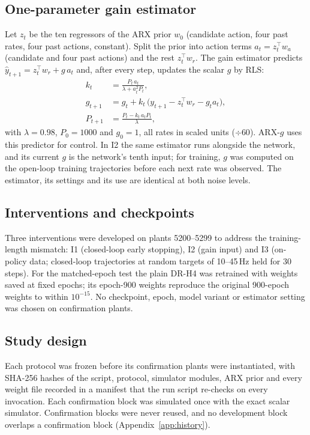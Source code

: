 \documentclass[11pt]{article}
\newcommand{\Hz}{\,Hz}
\begin{document}
\subsection{One-parameter gain estimator}\label{sec:gain}
Let $z_t$ be the ten regressors of the ARX prior $w_0$ (candidate action, four past rates, four past actions, constant). Split the prior into action terms $a_t=z_t^\top w_a$ (candidate and four past actions) and the rest $z_t^\top w_r$. The gain estimator predicts $\hat y_{t+1}=z_t^\top w_r + g\,a_t$ and, after every step, updates the scalar $g$ by RLS:
\begin{align}
k_t &= \frac{P_t\,a_t}{\lambda + a_t^2 P_t},\nonumber\\
g_{t+1} &= g_t + k_t\,\big(y_{t+1} - z_t^\top w_r - g_t a_t\big),\\
P_{t+1} &= \frac{P_t - k_t\,a_t P_t}{\lambda},\nonumber
\end{align}
with $\lambda=0.98$, $P_0=1000$ and $g_0=1$, all rates in scaled units ($\div60$). ARX-$g$ uses this predictor for control. In I2 the same estimator runs alongside the network, and its current $g$ is the network's tenth input; for training, $g$ was computed on the open-loop training trajectories before each next rate was observed. The estimator, its settings and its use are identical at both noise levels.

\subsection{Interventions and checkpoints}
Three interventions were developed on plants 5200--5299 to address the training-length mismatch: I1 (closed-loop early stopping), I2 (gain input) and I3 (on-policy data; closed-loop trajectories at random targets of 10--45\Hz{} held for 30 steps). For the matched-epoch test the plain DR-H4 was retrained with weights saved at fixed epochs; its epoch-900 weights reproduce the original 900-epoch weights to within $10^{-15}$. No checkpoint, epoch, model variant or estimator setting was chosen on confirmation plants.

\subsection{Study design}
Each protocol was frozen before its confirmation plants were instantiated, with SHA-256 hashes of the script, protocol, simulator modules, ARX prior and every weight file recorded in a manifest that the run script re-checks on every invocation. Each confirmation block was simulated once with the exact scalar simulator. Confirmation blocks were never reused, and no development block overlaps a confirmation block (Appendix~\ref{app:history}).
\end{document}
